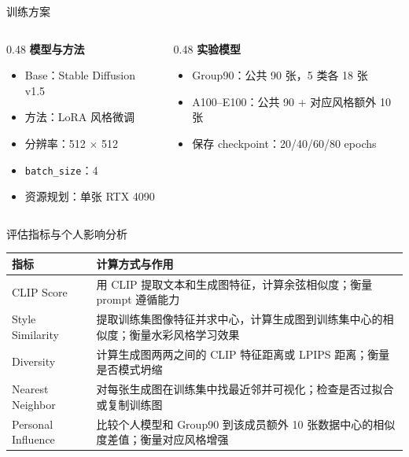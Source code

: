 \documentclass[aspectratio=169,11pt]{ctexbeamer}
\begin{document}
\begin{frame}{训练方案}
  \begin{columns}[T,onlytextwidth]
    \begin{column}{0.48\textwidth}
      \textbf{模型与方法}
      \begin{itemize}
        \item Base：Stable Diffusion v1.5
        \item 方法：LoRA 风格微调
        \item 分辨率：512 $\times$ 512
        \item \texttt{batch\_size}：4
        \item 资源规划：单张 RTX 4090
      \end{itemize}
    \end{column}
    \begin{column}{0.48\textwidth}
      \textbf{实验模型}
      \begin{itemize}
        \item Group90：公共 90 张，5 类各 18 张
        \item A100--E100：公共 90 + 对应风格额外 10 张
        \item 保存 checkpoint：20/40/60/80 epochs
      \end{itemize}
    \end{column}
  \end{columns}
\end{frame}

\begin{frame}{评估指标与个人影响分析}
  \small
  \begin{tabularx}{\textwidth}{l X}
    \toprule
    指标 & 计算方式与作用 \\
    \midrule
    CLIP Score & 用 CLIP 提取文本和生成图特征，计算余弦相似度；衡量 prompt 遵循能力 \\
    Style Similarity & 提取训练集图像特征并求中心，计算生成图到训练集中心的相似度；衡量水彩风格学习效果 \\
    Diversity & 计算生成图两两之间的 CLIP 特征距离或 LPIPS 距离；衡量是否模式坍缩 \\
    Nearest Neighbor & 对每张生成图在训练集中找最近邻并可视化；检查是否过拟合或复制训练图 \\
    Personal Influence & 比较个人模型和 Group90 到该成员额外 10 张数据中心的相似度差值；衡量对应风格增强 \\
    \bottomrule
  \end{tabularx}

\end{frame}
\end{document}

